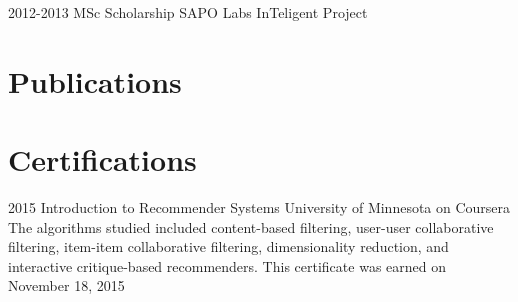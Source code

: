 \documentclass[]{friggeri-cv} %
\begin{document}
\begin{entrylist}
\entry
{2012-2013}
{MSc Scholarship}
{SAPO Labs}
{InTeligent Project}
\end{entrylist}


\section{Publications}

\begin{refsection} %
\nocite{*}
\printbibliography[sorting=chronological, type=inproceedings, title={international peer-reviewed conferences/proceedings}, notkeyword={france}, heading=subbibliography]
\end{refsection}




\section{Certifications}

\begin{entrylist}
	\entry
	{2015}
	{Introduction to Recommender Systems}
	{University of Minnesota on Coursera}
	{The algorithms studied included content-based filtering, user-user collaborative filtering, item-item collaborative filtering, dimensionality reduction, and interactive critique-based recommenders. This certificate was earned on November 18, 2015}
\end{entrylist}

\end{document}
